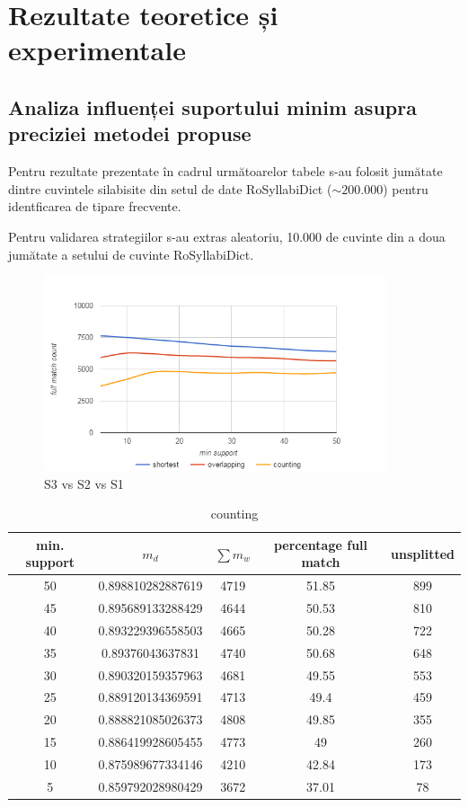 \chapter{Rezultate teoretice și experimentale}
\label{cap:rezultate}

\section{Analiza influenței suportului minim asupra preciziei metodei propuse}

Pentru rezultate prezentate în cadrul următoarelor tabele s-au folosit jumătate dintre cuvintele silabisite din setul de date RoSyllabiDict ($\sim200.000$) pentru identficarea de tipare frecvente. 

Pentru validarea strategiilor s-au extras aleatoriu, 10.000 de cuvinte din a doua jumătate a setului de cuvinte RoSyllabiDict.

\begin{figure}[h!]
    \centering
    \includegraphics[width=0.9\textwidth]{figures/rosil-word-precision.png}
    \caption{ S3 vs S2 vs S1}
    \label{fig:rosil-counting}
\end{figure}

 \begin{table}[h!]
\centering
\begin{tabular}{|c|c|c|c|c|}
\hline
min. support & $m_d$ & $\sum m_w$ & percentage full match & unsplitted\\ 
\hline
\hline
50 & 0.898810282887619 & 4719 & 51.85 & 899\\ 
\hline
45 & 0.895689133288429 & 4644 & 50.53 & 810\\ 
\hline
40 & 0.893229396558503 & 4665 & 50.28 & 722\\ 
\hline
35 & 0.89376043637831 & 4740 & 50.68 & 648\\ 
\hline
30 & 0.890320159357963 & 4681 & 49.55 & 553\\ 
\hline
25 & 0.889120134369591 & 4713 & 49.4 & 459\\ 
\hline
20 & 0.888821085026373 & 4808 & 49.85 & 355\\ 
\hline
15 & 0.886419928605455 & 4773 & 49 & 260\\ 
\hline
10 & 0.875989677334146 & 4210 & 42.84 & 173\\ 
\hline
5 & 0.859792028980429 & 3672 & 37.01 & 78\\ 
\hline\end{tabular}
\label{table:table}
\caption{counting} 
\end{table}


